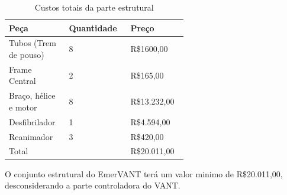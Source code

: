 \begin{table}[!h]
\centering
    \caption{Custos totais da parte estrutural}
\begin{tabular}{|p{0.20\linewidth}|p{0.20\linewidth}|p{0.20\linewidth}|}
\hline

Peça &Quantidade& Preço\\ \hline
Tubos (Trem de pouso)&8 &R\$1600,00\\ \hline
Frame Central &2 &R\$165,00\\ \hline
Braço, hélice e motor &8 &R\$13.232,00\\ \hline
Desfibrilador &1 &R\$4.594,00\\ \hline
Reanimador &3 &R\$420,00\\ \hline
Total& &R\$20.011,00\\ \hline
\end{tabular}
\end{table}

O conjunto estrutural do EmerVANT terá um valor minimo de R\$20.011,00, desconsiderando a parte controladora do VANT.